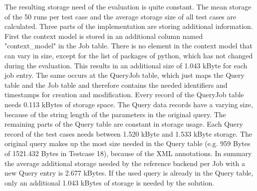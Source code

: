 \documentclass[draft,final]{vutinfth} %
\begin{document}
The resulting storage need of the evaluation is quite constant. The mean storage of the 50 runs per test case and the average storage size of all test cases are calculated. Three parts of the implementation are storing additional information. First the context model is stored in an additional column named "context\_model" in the Job table. There is no element in the context model that can vary in size, except for the list of packages of python, which has not changed during the evaluation. This results in an additional size of 1.043 kByte for each job entry. The same occurs at the QueryJob table, which just maps the Query table and the Job table and therefore contains the needed identifiers and timestamps for creation and modification. Every record of the QueryJob table needs 0.113 kBytes of storage space. The Query data records have a varying size, because of the string length of the parameters in the original query. The remaining parts of the Query table are constant in storage usage. Each Query record of the test cases needs between 1.520 kByte and 1.533 kByte storage. The original query makes up the most size needed in the Query table (e.g. 959 Bytes of 1521.432 Bytes in Testcase 18), because of the XML annotations. In summary the average additional storage needed by the reference backend per Job with a new Query entry is 2.677 kBytes. If the used query is already in the Query table, only an additional 1.043 kBytes of storage is needed by the solution. 
\end{document}
